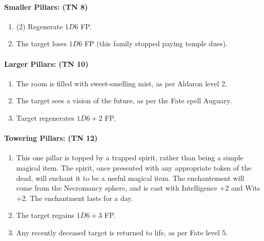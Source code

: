 \paragraph{Smaller Pillars: (TN 8)}

\begin{enumerate}

	\item{(2) Regenerate $1D6$ FP.}
	\item{The target loses $1D6$ FP (this family stopped paying temple dues).}
\end{enumerate}

\paragraph{Larger Pillars: (TN 10)}

\begin{enumerate}

	\item{The room is filled with sweet-smelling mist, as per Aldaron level 2.}
	\item{The target sees a vision of the future, as per the Fate spell Auguary.}
	\item{Target regenerates $1D6+2$ FP.}
\end{enumerate}

\paragraph{Towering Pillars: (TN 12)}

\begin{enumerate}

	\item{This one pillar is topped by a trapped spirit, rather than being a simple magical item.  The spirit, once presented with any appropriate token of the dead, will enchant it to be a useful magical item.  The enchantement will come from the Necromancy sphere, and is cast with Intelligence +2 and Wits +2.  The enchantment lasts for a day.}
	\item{The target regains $1D6+3$ FP.}
	\item{Any recently deceased target is returned to life, as per Fate level 5.}

\end{enumerate}


